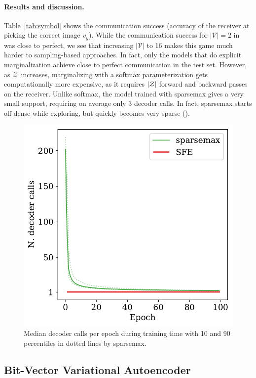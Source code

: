 \paragraph*{Results and discussion.}

Table~\ref{tab:symbol} shows the communication success (accuracy of
the receiver at picking the correct image $v_y$). While the
communication success for $|\mathcal{V}|=2$ in \citet{Lazaridou2017}
was close to perfect, we see that increasing $|\mathcal{V}|$ to 16
makes this game much harder to sampling-based approaches. In fact,
only the models that do explicit marginalization achieve close to
perfect communication in the test set. However, as $\mathcal{Z}$ increases,
marginalizing with a softmax parameterization gets computationally
more expensive, as it requires $|\mathcal{Z}|$ forward and backward passes on
the receiver. Unlike softmax, the model trained with sparsemax
gives a very small support, requiring on average only 3 decoder
calls. In fact, sparsemax
starts off dense while exploring, but quickly becomes very sparse
().

\begin{figure}[ht]
    \centering
    \includegraphics[width=0.45\columnwidth]{Figures/sparsemax_nonzero_em_comm.pdf}
    \caption{
        Median decoder calls per epoch during training
        time with 10 and 90 percentiles in dotted lines by sparsemax.
    }
    \label{fig:nonzero_comm}
\end{figure}

\subsection{Bit-Vector Variational Autoencoder}\label{sec:bernvae}

